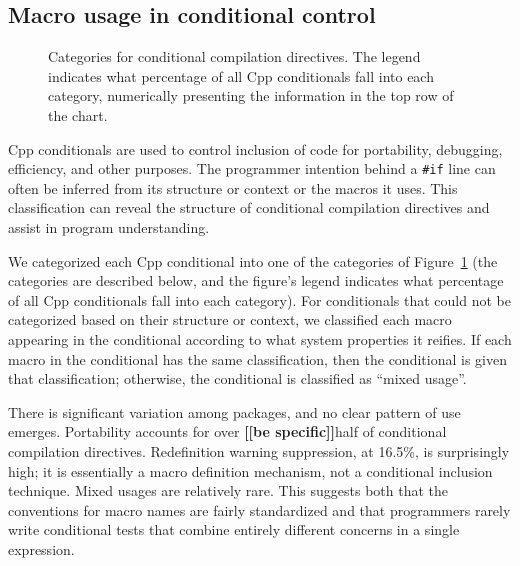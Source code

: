 \documentclass[10pt]{article}
\newcommand{\comment}[1]{\textbf{[[#1]]}}
\newcommand{\captionsmall}[1]{\caption[]{\small #1}}
\begin{document}


\subsection{Macro usage in conditional control}
\label{sec:ccd}

\begin{figure}
\centerline{}
\captionsmall{Categories for conditional compilation directives.
  The legend indicates what percentage of all Cpp conditionals fall
  into each category, numerically presenting the information in the top row
  of the chart.}
\label{fig:ccd-categories}
\end{figure}

Cpp conditionals are used to control inclusion of code for portability,
debugging, efficiency, and other purposes.  The programmer intention behind
a {\tt \#if} line can often be inferred from its structure or context or
the macros it uses.  This classification can reveal the structure of
conditional compilation directives and assist in program understanding.

We categorized each Cpp conditional into one of the categories of
Figure~\ref{fig:ccd-categories} (the categories are described below, and
the figure's legend indicates what percentage of all Cpp conditionals fall
into each category).  For
conditionals that could not be categorized based on their structure or
context, we classified each macro appearing in the conditional according to
what system properties it reifies.  If each macro in the conditional has the
same classification, then the conditional is given that classification;
otherwise, the conditional is classified as ``mixed usage''.

There is significant variation among packages, and no clear pattern of use
emerges.  Portability accounts for over \comment{be specific}half of conditional compilation
directives.  Redefinition warning suppression, at 16.5\%, is surprisingly
high; it is essentially a macro definition mechanism, not a conditional
inclusion technique.  Mixed usages are relatively rare.  This suggests
both that the conventions for macro names are fairly standardized and that
programmers rarely write conditional tests that combine entirely different
concerns in a single expression.
\end{document}
